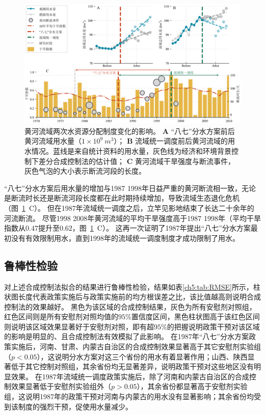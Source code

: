 \begin{figure}[!ht]
	\centering
	\includegraphics[width=\linewidth]{img/ch5/ch5_results.png}
	\caption[黄河流域两次水资源分配制度变化的影响]{
        黄河流域两次水资源分配制度变化的影响。
        \textbf{A} “八七”分水方案前后黄河流域用水量（$1 \times 10^9~m^3$）；
        \textbf{B} 流域统一调度前后黄河流域的用水情况。蓝线是来自统计资料的用水量，灰色线为经济和环境背景控制下差分合成控制法的估计值；
        \textbf{C} 黄河流域干旱强度与断流事件，灰色气泡的大小表示断流河段的长度。
	}\label{ch5:fig:main_results}
\end{figure}

“八七”分水方案后用水量的增加与1987 \textendash{} 1998年日益严重的黄河断流相一致，无论是断流时长还是断流河段长度都在此时期持续增加，导致流域生态退化危机（图~\ref{ch5:fig:main_results}~C）。
但在1987年流域统一调度之后，立竿见影地结束了长达二十余年的河流断流。
尽管1998 \textendash{} 2008年黄河流域的平均干旱强度高于1987 \textendash{} 1998年（平均干旱指数从$0.47$提升至$0.62$，图~\ref{ch5:fig:main_results}~C）。
这再一次证明了1987年提出“八七”分水方案最初没有有效限制用水，直到1998年的流域统一调度制度才成功限制了用水。

\subsection{鲁棒性检验}

对上述合成控制法拟合的结果进行鲁棒性检验，结果如表\ref{ch5:tab:RMSE}所示，柱状图长度代表政策实施后与政策实施前的均方根误差之比，该比值越高则说明合成控制法的效果越好。
黑色为该区域的合成控制结果，灰色为所有安慰剂对照组，红色区间则是所有安慰剂对照均值的$95\%$置信度区间，黑色柱状图高于该红色区间则说明该区域效果显著好于安慰剂对照，即有超$95\%$的把握说明政策干预对该区域的影响是明显的、且合成控制法有效模拟了此影响。
在1987年“八七”分水方案政策实施后，河南、甘肃、内蒙古自治区的合成控制效果显著高于其它安慰剂实验组（$p < 0.05$），这说明分水方案对这三个省份的用水有着显著作用；山西、陕西显著低于其它控制对照组，其余省份均无显著差异，说明政策干预对这些地区没有明显效果。
在1987年流域统一调度政策实施后，除了河南和内蒙古自治区的合成控制效果显著低于安慰剂实验组外（$p > 0.05$），其余省份都显著高于安慰剂实验组，这说明1987年的政策干预对河南与内蒙古的用水没有显著影响；其余省份均受到该制度的强烈干预，促使用水量减少。

